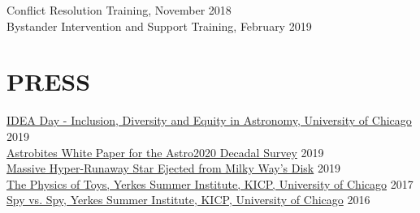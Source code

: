 \documentclass[margin]{res}
\begin{document}
\begin{resume}
Conflict Resolution Training, November 2018\\
Bystander Intervention and Support Training, February 2019

\section{PRESS}

\href{https://kicp.uchicago.edu/events/kicp_events-2019.html#id_1089} {IDEA Day - Inclusion, Diversity and Equity in Astronomy, University of Chicago} \hfill 2019\\
\href{http://womeninastronomy.blogspot.com/2019/07/astro2020-decadal-survey-white-papers.html}{Astrobites White Paper for the Astro2020 Decadal Survey} \hfill 2019\\
\href{https://news.umich.edu/u-m-researchers-confirm-massive-hyper-runaway-star-ejected-from-the-milky-way-disk/}{Massive Hyper-Runaway Star Ejected from Milky Way's Disk} \hfill 2019\\
\href{http://kicp.uchicago.edu/events/kicp_yerkes.html#id_959}{The Physics of Toys, Yerkes Summer Institute, KICP, University of Chicago} \hfill 2017\\
\href{http://kicp.uchicago.edu/events/kicp_yerkes.html#id_785}{Spy vs. Spy, Yerkes Summer Institute, KICP, University of Chicago} \hfill 2016\\










\end{resume}
\end{document}
